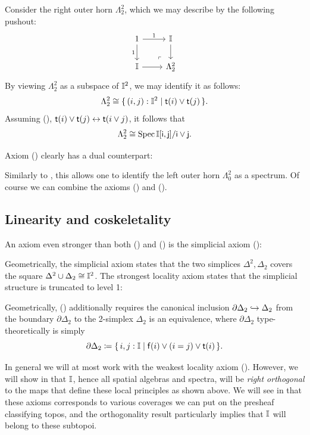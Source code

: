 \begin{example}\label{exm:hornsober}
  Consider the right outer horn $\Lambda^2_2$, which we may describe by the following pushout:
  \[
    \begin{tikzcd}
      1 \ar[d, "1"'] \ar[r, "1"] & \I \ar[d] \\
      \I \ar[r] & \Lambda^2_2
      \arrow["\lrcorner"{anchor=center, pos=0.125, rotate=180}, draw=none, from=2-2, to=1-1]
    \end{tikzcd}
  \]
  By viewing $\Lambda^2_2$ as a subspace of $\mathbb{I}^2$, we may identify it as follows:
  \[ \Lambda^2_2 \cong \scomp{(i,j) : \I^2}{\ist{i} \vee \ist{j}}\text{.} \]
  Assuming (\AxiomL), $\mathsf{t}(i) \vee \mathsf{t}(j) \leftrightarrow \mathsf{t}(i\vee j)$, it follows that 
  \[ \Lambda^2_2 \cong \spec \I[\ms{i},\ms{j}]/\ms{i} \vee \ms{j}\text{.} \]
\end{example}

Axiom (\AxiomL) clearly has a dual counterpart:


\PrintAxiomCL

Similarly to , this allows one to identify the left outer horn $\Lambda^2_0$ as a spectrum. Of course we can combine the axioms (\AxiomL) and (\AxiomCL). 

\subsection{Linearity and coskeletality}\label{sec:linearity-and-coskeletality}

An axiom even stronger than both (\AxiomL) and (\AxiomCL) is the simplicial axiom (\AxiomSL):

\PrintAxiomSL

Geometrically, the simplicial axiom states that the two simplices $\Delta^2,\Delta_2$ covers the square $\Delta^2 \cup \Delta_2 \cong \mathbb{I}^2$.
The strongest locality axiom states that the simplicial structure is truncated to level 1:


\PrintAxiomOneCS

Geometrically, (\AxiomOneCS) additionally requires the canonical inclusion $\partial\Delta_2 \hookrightarrow \Delta_2$ from the boundary $\partial\Delta_2$ to the 2-simplex $\Delta_2$ is an equivalence, where $\partial\Delta_2$ type-theoretically is simply
\[ \partial\Delta_2 \coloneq \scomp{i,j : \I}{\isf{i} \vee (i = j) \vee \ist{i}}\text{.} \]

In general we will at most work with the weakest locality axiom (\AxiomNT). However, we will show in  that $\mathbb{I}$, hence all spatial algebras and spectra, will be \emph{right orthogonal} to the maps that define these local principles as shown above. We will see in  that these axioms corresponds to various coverages we can put on the presheaf classifying topos, and the orthogonality result particularly implies that $\mathbb{I}$ will belong to these subtopoi.


